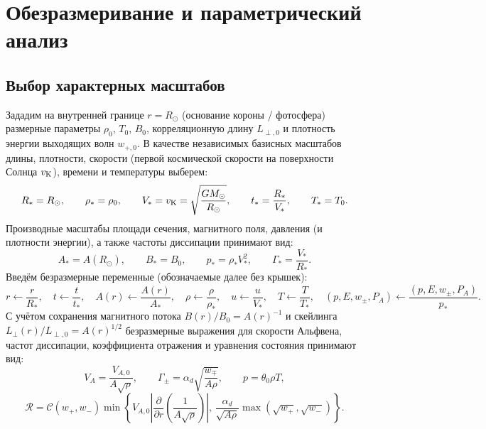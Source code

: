 \documentclass[11pt,a4paper]{article}
\begin{document}
\section{Обезразмеривание и параметрический анализ}

\subsection{Выбор характерных масштабов}

Зададим на внутренней границе $r = R_\odot$ (основание короны / фотосфера) размерные параметры $\rho_0$, $T_0$, $B_0$, корреляционную длину $L_{\perp,0}$ и плотность энергии выходящих волн $w_{+,0}$. В качестве независимых базисных масштабов длины, плотности, скорости (первой космической скорости на поверхности Солнца $v_{\rm K}$), времени и температуры выберем:
\begin{equation}
R_* = R_\odot, \qquad \rho_* = \rho_0, \qquad V_* = v_{\rm K} = \sqrt{\frac{GM_\odot}{R_\odot}}, \qquad t_* = \frac{R_*}{V_*}, \qquad T_* = T_0.
\label{eq:scales_base}
\end{equation}
Производные масштабы площади сечения, магнитного поля, давления (и плотности энергии), а также частоты диссипации принимают вид:
\begin{equation}
A_* = A(R_\odot), \qquad B_* = B_0, \qquad p_* = \rho_* V_*^2, \qquad \Gamma_* = \frac{V_*}{R_*}.
\label{eq:scales_derived}
\end{equation}
Введём безразмерные переменные (обозначаемые далее без крышек):
\[
r \leftarrow \frac{r}{R_*}, \quad t \leftarrow \frac{t}{t_*}, \quad A(r) \leftarrow \frac{A(r)}{A_*}, \quad \rho \leftarrow \frac{\rho}{\rho_*}, \quad u \leftarrow \frac{u}{V_*}, \quad T \leftarrow \frac{T}{T_*}, \quad (p, E, w_\pm, P_A) \leftarrow \frac{(p, E, w_\pm, P_A)}{p_*}.
\]
С учётом сохранения магнитного потока $B(r)/B_0 = A(r)^{-1}$ и скейлинга $L_\perp(r)/L_{\perp,0} = A(r)^{1/2}$ безразмерные выражения для скорости Альфвена, частот диссипации, коэффициента отражения и уравнения состояния принимают вид:
\begin{equation}
V_A = \frac{V_{A,0}}{A\sqrt{\rho}}, \qquad
\Gamma_\pm = \alpha_d\sqrt{\frac{w_\mp}{A\rho}}, \qquad
p = \theta_0\rho T,
\label{eq:dimless_closures}
\end{equation}
\begin{equation}
\mathcal{R} = \mathcal{C}(w_+, w_-)\min\left\{V_{A,0}\left|\frac{\partial}{\partial r}\left(\frac{1}{A\sqrt{\rho}}\right)\right|,\, \frac{\alpha_d}{\sqrt{A\rho}}\max\left(\sqrt{w_+}, \sqrt{w_-}\right)\right\}.
\label{eq:dimless_R}
\end{equation}
\end{document}
